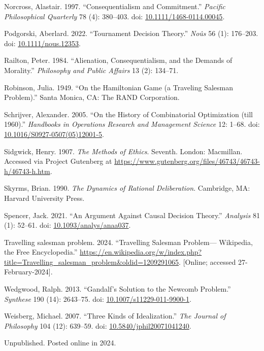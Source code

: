 \documentclass[
  10pt,
  letterpaper,
  DIV=11,
  numbers=noendperiod,
  twoside]{scrartcl}
\newlength{\cslhangindent}
\newenvironment{CSLReferences}[2] %
 {\begin{list}{}{%
  \setlength{\itemindent}{0pt}
  \setlength{\leftmargin}{0pt}
  \setlength{\parsep}{0pt}
  \ifodd #1
   \setlength{\leftmargin}{\cslhangindent}
   \setlength{\itemindent}{-1\cslhangindent}
  \fi
  \setlength{\itemsep}{#2\baselineskip}}}
 {\end{list}}
\begin{document}
\begin{CSLReferences}{1}{0}
Norcross, Alastair. 1997. {``Consequentialism and Commitment.''}
\emph{Pacific Philosophical Quarterly} 78 (4): 380--403. doi:
\href{https://doi.org/10.1111/1468-0114.00045}{10.1111/1468-0114.00045}.

Podgorski, Aberlard. 2022. {``Tournament Decision Theory.''}
\emph{No{û}s} 56 (1): 176--203. doi:
\href{https://doi.org/10.1111/nous.12353}{10.1111/nous.12353}.

Railton, Peter. 1984. {``Alienation, Consequentialism, and the Demands
of Morality.''} \emph{Philosophy and Public Affairs} 13 (2): 134--71.

Robinson, Julia. 1949. {``On the Hamiltonian Game (a Traveling Salesman
Problem).''} Santa Monica, CA: The RAND Corporation.

Schrijver, Alexander. 2005. {``On the History of Combinatorial
Optimization (till 1960).''} \emph{Handbooks in Operations Research and
Management Science} 12: 1--68. doi:
\href{https://doi.org/10.1016/S0927-0507(05)12001-5}{10.1016/S0927-0507(05)12001-5}.

Sidgwick, Henry. 1907. \emph{The Methods of Ethics}. Seventh. London:
Macmillan. Accessed via Project Gutenberg at
\url{https://www.gutenberg.org/files/46743/46743-h/46743-h.htm}.

Skyrms, Brian. 1990. \emph{The Dynamics of Rational Deliberation}.
Cambridge, MA: Harvard University Press.

Spencer, Jack. 2021. {``An Argument Against Causal Decision Theory.''}
\emph{Analysis} 81 (1): 52--61. doi:
\href{https://doi.org/10.1093/analys/anaa037}{10.1093/analys/anaa037}.

Travelling salesman problem. 2024. {``Travelling Salesman Problem---
{W}ikipedia{,} the Free Encyclopedia.''}
\url{https://en.wikipedia.org/w/index.php?title=Travelling_salesman_problem&oldid=1209291065}.
{[}Online; accessed 27-February-2024{]}.

Wedgwood, Ralph. 2013. {``Gandalf's Solution to the Newcomb Problem.''}
\emph{Synthese} 190 (14): 2643--75. doi:
\href{https://doi.org/10.1007/s11229-011-9900-1}{10.1007/s11229-011-9900-1}.

Weisberg, Michael. 2007. {``Three Kinds of Idealization.''} \emph{The
Journal of Philosophy} 104 (12): 639--59. doi:
\href{https://doi.org/10.5840/jphil20071041240}{10.5840/jphil20071041240}.

\end{CSLReferences}



\noindent Unpublished. Posted online in 2024.
\end{document}

